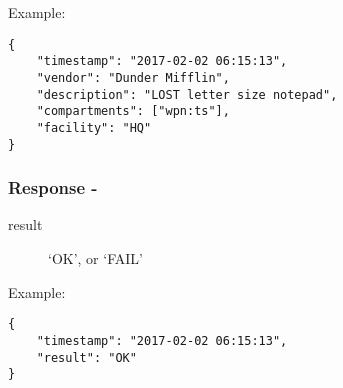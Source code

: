 \noindent Example:
\begin{verbatim}
{
    "timestamp": "2017-02-02 06:15:13",
    "vendor": "Dunder Mifflin",
    "description": "LOST letter size notepad",
    "compartments": ["wpn:ts"],
    "facility": "HQ"
}
\end{verbatim}


\subsubsection*{Response -}
\begin{description}
\item[result] `OK', or `FAIL'
\end{description}

\noindent Example:
\begin{verbatim}
{
    "timestamp": "2017-02-02 06:15:13",
    "result": "OK"
}
\end{verbatim}